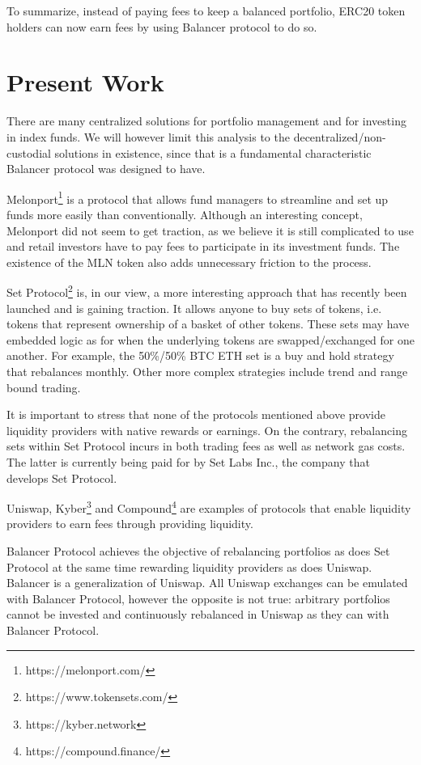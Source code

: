 \documentclass[11pt]{amsart}
\begin{document}
To summarize, instead of paying fees to keep a balanced portfolio, ERC20 token holders can now earn fees by using Balancer protocol to do so. 


\section{Present Work}

There are many centralized solutions for portfolio management and for investing in index funds. We will however limit this analysis to the decentralized/non-custodial solutions in existence, since that is a fundamental characteristic Balancer protocol was designed to have.

Melonport\footnote{https://melonport.com/} is a protocol that allows fund managers to streamline and set up funds more easily than conventionally. Although an interesting concept, Melonport did not seem to get traction, as we believe it is still complicated to use and retail investors have to pay fees to participate in its investment funds. The existence of the MLN token also adds unnecessary friction to the process.

Set Protocol\footnote{https://www.tokensets.com/} is, in our view, a more interesting approach that has recently been launched and is gaining traction. It allows anyone to buy sets of tokens, i.e. tokens that represent ownership of a basket of other tokens. These sets may have embedded logic as for when the underlying tokens are swapped/exchanged for one another. For example, the 50\%/50\% BTC ETH set is a buy and hold strategy that rebalances monthly. Other more complex strategies include trend and range bound trading. 

It is important to stress that none of the protocols mentioned above provide liquidity providers with native rewards or earnings. On the contrary, rebalancing sets within Set Protocol incurs in both trading fees as well as network gas costs. The latter is currently being paid for by Set Labs Inc., the company that develops Set Protocol.

Uniswap, Kyber\footnote{https://kyber.network}  and Compound\footnote{https://compound.finance/} are examples of protocols that enable liquidity providers to earn fees through providing liquidity.

Balancer Protocol achieves the objective of rebalancing portfolios as does Set Protocol at the same time rewarding liquidity providers as does Uniswap. Balancer is a generalization of Uniswap. All Uniswap exchanges can be emulated with Balancer Protocol, however the opposite is not true: arbitrary portfolios cannot be invested and continuously rebalanced in Uniswap as they can with Balancer Protocol. 
\end{document}
